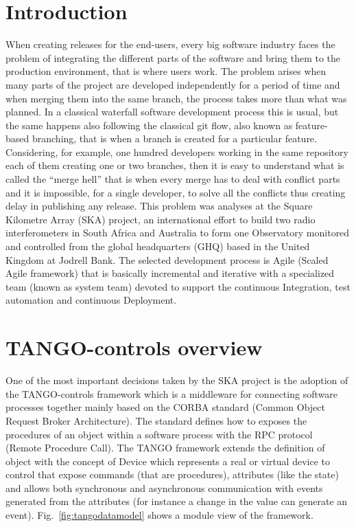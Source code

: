 \documentclass[a4paper,
               keeplastbox,   %
               ]{jacow}
\begin{document}
\section{Introduction}
When creating releases for the end-users, every big software industry faces the problem of integrating the different parts of the software and bring them to the production environment, that is where users work. The problem arises when many parts of the project are developed independently for a period of time and when merging them into the same branch, the process takes more than what was planned. In a classical waterfall software development process this is usual, but the same happens also following the classical git flow, also known as feature-based branching, that is when a branch is created for a particular feature. Considering, for example, one hundred developers working in the same repository each of them creating one or two branches, then it is easy to understand what is called the “merge hell” that is when every merge has to deal with conflict parts and it is impossible, for a single developer, to solve all the conflicts thus creating delay in publishing any release. 
This problem was analyses at the Square Kilometre Array (SKA) project, an international effort to build two radio interferometers in South Africa and Australia to form one Observatory monitored and controlled from the global headquarters (GHQ) based in the United Kingdom at Jodrell Bank.  
The selected development process is Agile (Scaled Agile framework) that is basically incremental and iterative with a specialized team (known as system team) devoted to support the continuous Integration, test automation and continuous Deployment.


\section{TANGO-controls overview}
One of the most important decisions taken by the SKA project is the adoption of the TANGO-controls framework which is a middleware for connecting software processes together mainly based on the CORBA standard (Common Object Request Broker Architecture). The standard defines how to exposes the procedures of an object within a software process with the RPC protocol (Remote Procedure Call).  The TANGO framework extends the definition of object with the concept of Device which represents a real or virtual device to control that expose commands (that are procedures), attributes (like the state) and allows both synchronous and asynchronous communication with events generated from the attributes (for instance a change in the value can generate an event). Fig.~\ref{fig:tangodatamodel}  shows a module view of the framework.
\end{document}

